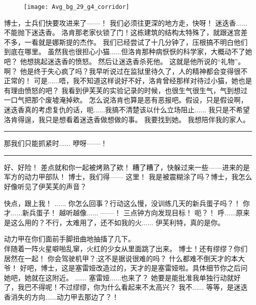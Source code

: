 \documentclass[openany]{book}
\begin{document}
\begin{figure}[h]
    \centering
    \texttt{[image: Avg\_bg\_29\_g4\_corridor]}
\end{figure}
\begin{dialogue}
     博士，士兵们快要攻进来了——！
     我们必须往更深的地方走，快呀！
     迷迭香......不能抛下迷迭香。
     洛肯那老家伙锁了门！这栋建筑的结构太特殊了，就跟迷宫差不多，一看就是娜斯提的杰作。
     我们已经尝试了十几分钟了，压根搞不明白他们到底在哪里。
     虽然我也很担心小猫......但洛肯那种病恹恹的科学家，大概动不了她吧？
     他想挑起迷迭香的愤怒。
     然后让迷迭香杀死他。
     这就是他所说的“礼物”。
     啊？
     他是终于失心疯了吗？我早听说过在监狱里待久了，人的精神都会变得很不正常的！
     可是......唔，我不知道这样说好不好，洛肯曾经那样对待过小猫，她也是有理由愤怒的吧？
     我看到伊芙芙的实验记录的时候，也很生气很生气，气到想过一口气把那个废墟淹掉欸。
     怎么说洛肯也算是恶有恶报吧。假设，只是假设啊，迷迭香真的考虑复仇的话，呃......我搞不清楚该以什么立场阻止......
     我只是不希望洛肯得逞，我只是想看着迷迭香做想做的事。
     我要找到她。
     我想陪伴我的家人。
    \par\noindent\rule{\textwidth}{0.4pt}
     那我们只能抓紧时......
     咿呀——！
    \par\noindent\rule{\textwidth}{0.4pt}
     好、好险！
     差点就和你一起被烤熟了欸！
     糟了糟了，快躲过来一些——进来的是军方的动力甲部队！
     博士，我们得——
     这里！
     我是被震糊涂了吗？博士，我怎么好像听见了伊芙芙的声音？
\end{dialogue}

\begin{dialogue}
     快点，跟上我！
     ......
     你怎么回事？行动这么慢，没训练几天的新兵蛋子吗？！
     你才......新兵蛋子！
     越听越像......
     ——！
     三点钟方向发现目标！
     呃？！
     呼......原来是这么用的？不行，太难用了，还不如我的火......
     伊芙利特，真的是你。\par
    动力甲在你们面前手脚扭曲地抽搐了几下。\\
    伴随着一阵火星噼啪乱窜，火红的少女从里面跳了出来。
     博士！还有缪缪？你们居然在一起！
     你会驾驶机甲？;这不是据说很难的吗？
     什么都难不倒天才的本大爷！
     好吧，博士，这是塞雷娅改造过的，天才的是塞雷娅啦。具体细节你之后问她吧，她就在这附近。
     ......
     塞雷娅......也来了？
     她要是能批准我单独行动就好了，我巴不得呢！不过缪缪，你为什么看起来不太高兴？
     我不......
     等等，是迷迭香消失的方向......动力甲去那边了？！
\end{dialogue}
\end{document}
